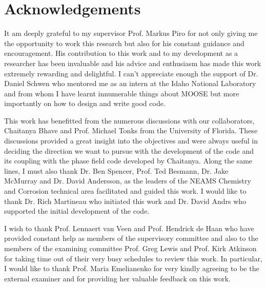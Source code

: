 \chapter*{Acknowledgements}
\label{acknowledgements}

It am deeply grateful to my supervisor Prof. Markus Piro for not only giving me the opportunity to work this research but also for his constant guidance and encouragement. His contribution to this work and to my development as a researcher has been invaluable and his advice and enthusiasm has made this work extremely rewarding and delightful. I can't appreciate enough the support of Dr. Daniel Schwen who mentored me as an intern at the Idaho National Laboratory and from whom I have learnt innumerable things about MOOSE but more importantly on how to design and write good code.

This work has benefitted from the numerous discussions with our collaborators, Chaitanya Bhave and Prof. Michael Tonks from the University of Florida. These discussions provided a great insight into the objectives and were always useful in deciding the direction we want to pursue with the development of the code and its coupling with the phase field code developed by Chaitanya. Along the same lines, I must also thank Dr. Ben Spencer, Prof. Ted Besmann, Dr. Jake McMurray and Dr. David Andersson, as the leaders of the NEAMS Chemistry and Corrosion technical area facilitated and guided this work. I would like to thank Dr. Rich Martineau who initiated this work and Dr. David Andrs who supported the initial development of the code.

I wish to thank Prof. Lennaert van Veen and Prof. Hendrick de Haan who have provided constant help as members of the supervisory committee and also to the members of the examining committee Prof. Greg Lewis and Prof. Kirk Atkinson for taking time out of their very busy schedules to review this work. In particular, I would like to thank Prof. Maria Emelianenko for very kindly agreeing to be the external examiner and for providing her valuable feedback on this work.

